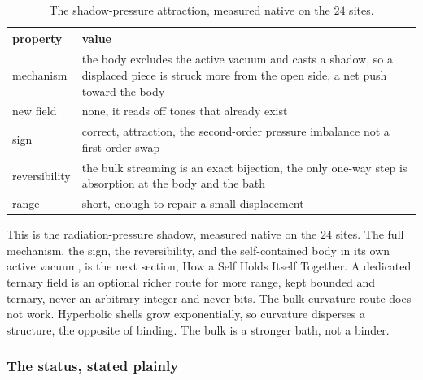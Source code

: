 \begin{table}[ht]
\centering
\begin{tabular}{@{}p{}p{}@{}}
\toprule
property & value \\
\midrule
mechanism & the body excludes the active vacuum and casts a shadow, so a displaced piece is struck more from the open side, a net push toward the body \\
new field & none, it reads off tones that already exist \\
sign & correct, attraction, the second-order pressure imbalance not a first-order swap \\
reversibility & the bulk streaming is an exact bijection, the only one-way step is absorption at the body and the bath \\
range & short, enough to repair a small displacement \\
\bottomrule
\end{tabular}
\caption{The shadow-pressure attraction, measured native on the $24$ sites.}
\label{tab:binding}
\end{table}

This is the radiation-pressure shadow, measured native on the $24$ sites. The full mechanism, the sign, the reversibility, and the self-contained body in its own active vacuum, is the next section, How a Self Holds Itself Together. A dedicated ternary field is an optional richer route for more range, kept bounded and ternary, never an arbitrary integer and never bits. The bulk curvature route does not work. Hyperbolic shells grow exponentially, so curvature disperses a structure, the opposite of binding. The bulk is a stronger bath, not a binder.

\subsubsection{The status, stated plainly}

